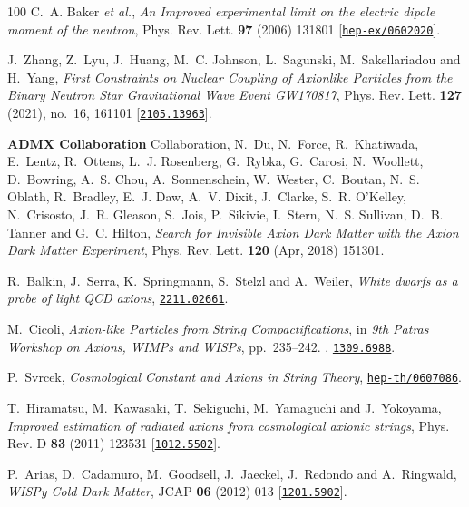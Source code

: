 \begin{thebibliography}{100}
C.~A. Baker {\em et al.},  {\em {An Improved experimental limit on the electric
  dipole moment of the neutron}}, Phys. Rev. Lett. {\bf 97} (2006) 131801
  [\href{http://www.arXiv.org/abs/hep-ex/0602020}{{\tt hep-ex/0602020}}].

J.~Zhang, Z.~Lyu, J.~Huang, M.~C. Johnson, L.~Sagunski, M.~Sakellariadou and
  H.~Yang,  {\em {First Constraints on Nuclear Coupling of Axionlike Particles
  from the Binary Neutron Star Gravitational Wave Event GW170817}}, Phys. Rev.
  Lett. {\bf 127} (2021), no.~16, 161101
  [\href{http://www.arXiv.org/abs/2105.13963}{{\tt 2105.13963}}].

{\bf ADMX Collaboration} Collaboration, N.~Du, N.~Force, R.~Khatiwada,
  E.~Lentz, R.~Ottens, L.~J. Rosenberg, G.~Rybka, G.~Carosi, N.~Woollett,
  D.~Bowring, A.~S. Chou, A.~Sonnenschein, W.~Wester, C.~Boutan, N.~S. Oblath,
  R.~Bradley, E.~J. Daw, A.~V. Dixit, J.~Clarke, S.~R. O'Kelley, N.~Crisosto,
  J.~R. Gleason, S.~Jois, P.~Sikivie, I.~Stern, N.~S. Sullivan, D.~B. Tanner
  and G.~C. Hilton,  {\em Search for Invisible Axion Dark Matter with the Axion
  Dark Matter Experiment}, Phys. Rev. Lett. {\bf 120} (Apr, 2018) 151301.

R.~Balkin, J.~Serra, K.~Springmann, S.~Stelzl and A.~Weiler,  {\em {White
  dwarfs as a probe of light QCD axions}},
  \href{http://www.arXiv.org/abs/2211.02661}{{\tt 2211.02661}}.

M.~Cicoli,  {\em {Axion-like Particles from String Compactifications}}, in {\em
  {9th Patras Workshop on Axions, WIMPs and WISPs}}, pp.~235--242.
.
\newblock \href{http://www.arXiv.org/abs/1309.6988}{{\tt 1309.6988}}.

P.~Svrcek,  {\em {Cosmological Constant and Axions in String Theory}},
  \href{http://www.arXiv.org/abs/hep-th/0607086}{{\tt hep-th/0607086}}.

T.~Hiramatsu, M.~Kawasaki, T.~Sekiguchi, M.~Yamaguchi and J.~Yokoyama,  {\em
  {Improved estimation of radiated axions from cosmological axionic strings}},
  Phys. Rev. D {\bf 83} (2011) 123531
  [\href{http://www.arXiv.org/abs/1012.5502}{{\tt 1012.5502}}].

P.~Arias, D.~Cadamuro, M.~Goodsell, J.~Jaeckel, J.~Redondo and A.~Ringwald,
  {\em {WISPy Cold Dark Matter}}, JCAP {\bf 06} (2012) 013
  [\href{http://www.arXiv.org/abs/1201.5902}{{\tt 1201.5902}}].


\end{thebibliography}
